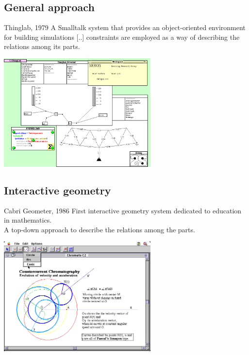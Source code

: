 \documentclass{beamer}
\begin{document}
\subsection{General approach}
\begin{frame}{Thinglab, 1979\cite{borning79}}
  A Smalltalk system that provides an
  object-oriented environment for building simulations [..]
  constraints are employed as a way of describing the relations among
  its parts.
  \begin{center}
    \includegraphics[width=0.6\textwidth]{thinglab.png}           
  \end{center}
\end{frame}

\subsection{Interactive geometry}
\begin{frame}{Cabri Geometer, 1986\cite{laborde86}}
  First interactive geometry system dedicated to
  education in mathematics. \\
  A top-down approach to describe the relations among the parts.
  \begin{center}
    \includegraphics[width=0.6\textwidth]{cabri.png}           
  \end{center}
\end{frame}
\end{document}
